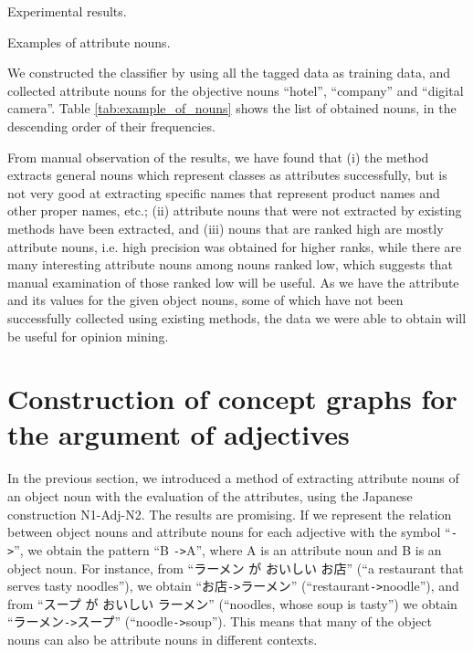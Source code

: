 \documentclass[english]{jnlp_1.4}
\begin{document}
\begin{table}[b]
\caption{Experimental results.}
\label{tab:svm_result}

\end{table}
\begin{table}[b]
\caption{Examples of attribute nouns.}
\label{tab:example_of_nouns}

\end{table}


We constructed the classifier by using all the tagged data as training
data, and collected attribute nouns for the objective nouns ``hotel'',
``company'' and ``digital camera''. Table \ref{tab:example_of_nouns}
shows the list of obtained nouns, in the descending order of their
frequencies.

From manual observation of the results, we have found that (i) the
method extracts general nouns which represent classes as attributes
successfully, but is not very good at extracting specific names that
represent product names and other proper names, etc.; (ii) attribute
nouns that were not extracted by existing methods have been extracted,
and (iii) nouns that are ranked high are mostly attribute nouns,
i.e. high precision was obtained for higher ranks, while there are many
interesting attribute nouns among nouns ranked low, which suggests that
manual examination of those ranked low will be useful. As we have the
attribute and its values for the given object nouns, some of which have
not been successfully collected using existing methods, the data we were
able to obtain will be useful for opinion mining.


\section{Construction of concept graphs for the argument of adjectives}

In the previous section, we introduced a method of extracting
attribute nouns of an object noun with the evaluation of the attributes,
using the Japanese construction N1-Adj-N2. The results are promising. 
If we represent the relation between object nouns and attribute nouns 
for each adjective with the symbol ``\verb|->|'', we obtain the pattern 
``B \verb+->+A'', where A is an attribute noun and B is an object noun. 
For instance, from ``ラーメン が おいしい お店'' (``a restaurant 
that serves tasty noodles''), we obtain ``お店\verb|->|ラーメン'' 
(``restaurant\verb|->|noodle''), and from \mbox{``スー}プ が おいしい ラーメン''
(``noodles, whose soup is tasty'') we 
obtain ``ラーメン\verb|->|スープ'' (``noodle\verb|->|soup'').
This means that many of the object nouns can also be attribute nouns
in different contexts.
\end{document}
